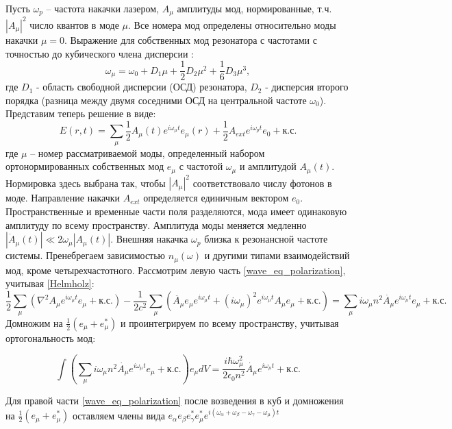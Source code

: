 Пусть $\omega_p$ -- частота накачки лазером, $A_\mu$ амплитуды мод, нормированные, т.ч. $|A_\mu|^2$ число квантов в моде $\mu$. Все номера мод определены относительно моды накачки $\mu=0$. Выражение для собственных мод резонатора с частотами с точностью до кубического члена дисперсии \cite{Herr2012}:
\begin{equation}\label{dispersion_eq}
\omega_\mu=\omega_0+D_1\mu+\frac{1}{2}D_2\mu^2+\frac{1}{6}D_3\mu^3,
\end{equation}
где $D_1$ - область свободной дисперсии (ОСД) резонатора, $D_2$ - дисперсия второго порядка (разница между двумя соседними ОСД на центральной частоте $\omega_0$). Представим теперь решение в виде:
\begin{equation}\label{SMA_E}
E(r,t)=\sum_\mu\frac{1}{2}A_\mu(t)e^{i\omega_\mu t}e_\mu(r)+\frac{1}{2}A_{ext}e^{i\omega_pt}e_0+\text{к.с.}
\end{equation}
где $\mu$ -- номер рассматриваемой моды, определенный набором ортонормированных собственных мод $e_\mu$ с частотой $\omega_\mu$ и амплитудой $A_\mu(t)$. Нормировка здесь выбрана так, чтобы $|A_\mu|^2$ соответствовало числу фотонов в моде. Направление накачки $A_{ext}$ определяется единичным вектором $e_0$. Пространственные и временные части поля разделяются, мода имеет одинаковую амплитуду по всему пространству. Амплитуда моды меняется медленно $|\dot{A}_\mu(t)|\ll2\omega_\mu|A_\mu(t)|$. Внешняя накачка $\omega_p$ близка к резонансной частоте системы. Пренебрегаем зависимостью $n_\mu(\omega)$ и другими типами взаимодействий мод, кроме четырехчастотного. Рассмотрим левую часть \eqref{wave_eq_polarization}, учитывая \eqref{Helmholz}:
%
\begin{equation}
\frac{1}{2}\sum_\mu(\nabla^2A_\mu e^{i\omega_\mu t}e_\mu+\text{к.с.})-\frac{1}{2c^2}\sum_\mu(\ddot{A_\mu}e_\mu e^{i\omega_\mu t}+(i\omega_\mu)^2e^{i\omega_\mu t}A_\mu e_\mu+\text{к.с.})=\sum_\mu i\omega_\mu n^2 \dot{A_\mu}e^{i\omega_\mu t}e_\mu+\text{к.с.}
\end{equation}
%
Домножим на $\frac{1}{2}(e_\mu+e_\mu^*)$ и проинтегрируем по всему пространству, учитывая ортогональность мод:

\begin{equation}
\int(\sum_\mu i\omega_\mu n^2 \dot{A_\mu}e^{i\omega_\mu t}e_\mu+\text{к.с.})e_\mu dV=\frac{i\hbar\omega_\mu^2}{2\epsilon_0n^2}\dot{A_\mu}e^{i\omega_\mu t}+\text{к.с.}
\end{equation}

Для правой части \eqref{wave_eq_polarization} после возведения в куб и домножения на $\frac{1}{2}(e_\mu+e_\mu^*)$ оставляем члены вида $e_\alpha e_\beta e_\gamma^* e_\mu^* e^{i(\omega_\alpha+\omega_\beta-\omega_\gamma-\omega_\mu)t}$

